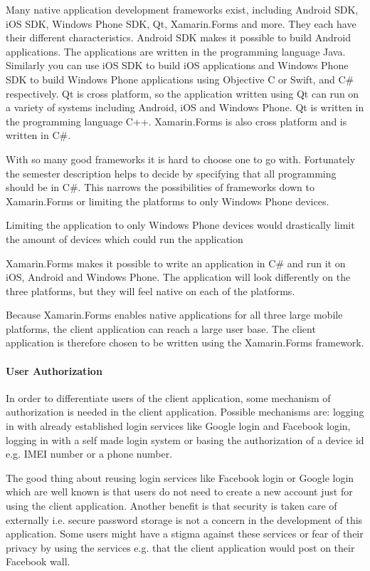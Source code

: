 Many native application development frameworks exist, including Android SDK, iOS SDK, Windows Phone SDK, Qt, Xamarin.Forms and more. They each have their different characteristics. Android SDK makes it possible to build Android applications. The applications are written in the programming language Java. Similarly you can use iOS SDK to build iOS applications and Windows Phone SDK to build Windows Phone applications using Objective C or Swift, and C\# respectively. Qt is cross platform, so the application written using Qt can run on a variety of systems including Android, iOS and Windows Phone. Qt is written in the programming language C++. Xamarin.Forms is also cross platform and is written in C\#.

With so many good frameworks it is hard to choose one to go with. Fortunately the semester description helps to decide by specifying that all programming should be in C\#. This narrows the possibilities of frameworks down to Xamarin.Forms or limiting the platforms to only Windows Phone devices.

Limiting the application to only Windows Phone devices would drastically limit the amount of devices which could run the application

Xamarin.Forms makes it possible to write an application in C\# and run it on iOS, Android and Windows Phone. The application will look differently on the three platforms, but they will feel native on each of the platforms.

Because Xamarin.Forms enables native applications for all three large mobile platforms, the client application can reach a large user base. The client application is therefore chosen to be written using the Xamarin.Forms framework.

\paragraph{User Authorization}
\label{par:user_authorization}

In order to differentiate users of the client application, some mechanism of authorization is needed in the client application. Possible mechanisms are: logging in with already established login services like Google login and Facebook login, logging in with a self made login system or basing the authorization of a device id e.g. IMEI number or a phone number.

The good thing about reusing login services like Facebook login or Google login which are well known is that users do not need to create a new account just for using the client application. Another benefit is that security is taken care of externally i.e. secure password storage is not a concern in the development of this application. Some users might have a stigma against these services or fear of their privacy by using the services e.g. that the client application would post on their Facebook wall.

